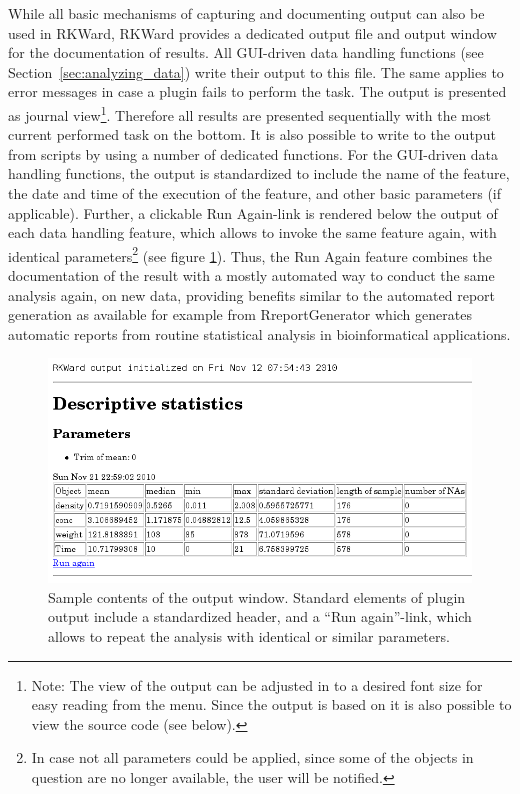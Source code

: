 While all basic mechanisms of
capturing and documenting  output can also
be used in RKWard, RKWard provides a dedicated output file and output
window for the documentation of results. All GUI-driven data handling
functions (see Section~\ref{sec:analyzing_data}) write their output to this file. 
The same applies to error messages in case a plugin fails to perform the task.
The output is presented as journal view\footnote{Note: The view of the output can be adjusted in
to a desired font size for easy reading from the menu. 
Since the output is based on  it is also possible to view the source code 
(see below).}. Therefore all results are presented
sequentially with the most current performed task on the bottom.
It is also possible to write to the output from 
scripts by using a number of dedicated 
functions. For the GUI-driven data handling functions, the output is
standardized to include the name of the feature, the date and time of
the execution of the feature, and other basic parameters (if
applicable). Further, a clickable Run
Again-link is rendered below the output of each data
handling feature, which allows to invoke the same feature again, with
identical parameters\footnote{In case not all parameters could be
applied, since some of the  objects in
question are no longer available, the user will be notified.} (see
figure \ref{fig:results_output}). Thus, the Run
Again feature combines the documentation of the result
with a mostly automated way to conduct the same analysis again, on new
data, providing benefits similar to the automated report generation as
available for example from RreportGenerator
\citep{RaffelsbergerW2008} which generates automatic
reports from routine statistical analysis in bioinformatical
applications.

\begin{figure}[htp]
 \centering
 \includegraphics[width=15.5cm]{../figures/results_output_cropped.png}
 \caption{Sample contents of the output window. Standard elements of plugin output include
 a standardized header, and a ``Run again''-link, which allows to repeat the analysis with
 identical or similar parameters.}
 \label{fig:results_output}
\end{figure}

